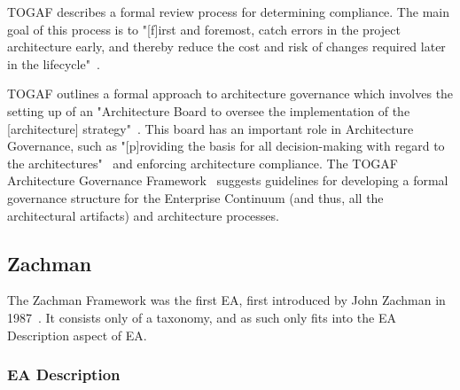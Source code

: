 TOGAF describes a formal review process for determining compliance. The main goal of this process is to "[f]irst and foremost, catch errors in the project architecture early, and thereby reduce the cost and risk of changes required later in the lifecycle"~\cite[Ch. 48.3.1]{togaf9.1}.



TOGAF outlines a formal approach to architecture governance which involves the setting up of an "Architecture Board to oversee the implementation of the [architecture] strategy"~\cite[Ch. 47.1]{togaf9.1}. This board has an important role in Architecture Governance, such as "[p]roviding the basis for all decision-making with regard to the architectures"~\cite[Ch. 47.2]{togaf9.1} and enforcing architecture compliance. The TOGAF Architecture Governance Framework~\cite[Ch. 50]{togaf9.1} suggests guidelines for developing a formal governance structure for the Enterprise Continuum (and thus, all the architectural artifacts) and architecture processes. 



%

\subsection{Zachman}
The Zachman Framework was the first EA, first introduced by John Zachman in 1987~\cite{sessions2007,zachman}. It consists only of a taxonomy, and as such only fits into the EA Description aspect of EA. 

\subsubsection{EA Description}

